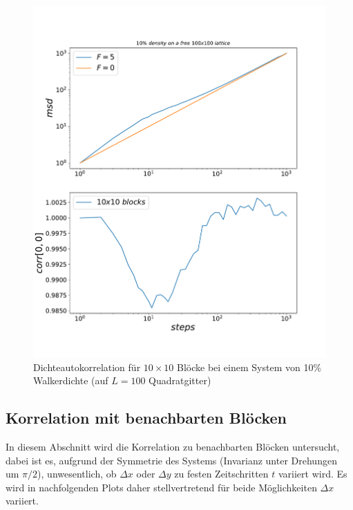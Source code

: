 \documentclass[a4paper, 12pt]{report}
\begin{document}
\begin{figure}[h!]
	\centering
	\includegraphics[scale=0.6]{autocorr10.pdf}
	\caption{Dichteautokorrelation für $10\times 10$ Blöcke bei einem System von 10\% Walkerdichte (auf $L=100$ Quadratgitter)}
\end{figure}

\clearpage

\subsection{Korrelation mit benachbarten Blöcken}

In diesem Abschnitt wird die Korrelation zu benachbarten Blöcken untersucht, dabei ist es, aufgrund der Symmetrie des Systems (Invarianz unter Drehungen um $\pi/2$), unwesentlich, ob $\Delta x$ oder $\Delta y$ zu festen Zeitschritten $t$ variiert wird. Es wird in nachfolgenden Plots daher stellvertretend für beide Möglichkeiten $\Delta x$ variiert.
\end{document}
